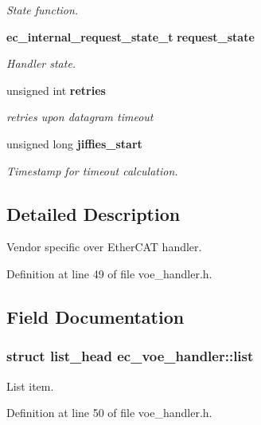 \begin{DoxyCompactItemize}
\begin{DoxyCompactList}\small\item\em \-State function. \end{DoxyCompactList}\item 
{\bf ec\-\_\-internal\-\_\-request\-\_\-state\-\_\-t} {\bf request\-\_\-state}
\begin{DoxyCompactList}\small\item\em \-Handler state. \end{DoxyCompactList}\item 
unsigned int {\bf retries}\label{structec__voe__handler_a94b591afc9239d7da95ce47108211048}

\begin{DoxyCompactList}\small\item\em retries upon datagram timeout \end{DoxyCompactList}\item 
unsigned long {\bf jiffies\-\_\-start}
\begin{DoxyCompactList}\small\item\em \-Timestamp for timeout calculation. \end{DoxyCompactList}\end{DoxyCompactItemize}


\subsection{\-Detailed \-Description}
\-Vendor specific over \-Ether\-C\-A\-T handler. 

\-Definition at line 49 of file voe\-\_\-handler.\-h.



\subsection{\-Field \-Documentation}
\subsubsection[{list}]{\setlength{\rightskip}{0pt plus 5cm}struct list\-\_\-head {\bf ec\-\_\-voe\-\_\-handler\-::list}}\label{structec__voe__handler_ab078e6fbc73c7bb4f7cb465b6c4abfa3}


\-List item. 



\-Definition at line 50 of file voe\-\_\-handler.\-h.

